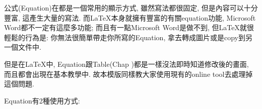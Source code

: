 

公式(Equation)在都是一個常用的顯示方式, 雖然寫法都很固定, 但是內容可以十分豐富, 這產生大量的寫法. 而LaTeX本身就擁有豐富的有關equation功能, Microsoft Word都不一定有這麼多功能; 而且有一點Microsoft Word是做不到, 但LaTeX就很輕鬆的行為是: 你無法很簡單帶走你所寫的Equation, 拿去轉成圖片或是copy到另一個文件中.

但是在LaTeX中, Equation跟Table(Chap )都是一樣沒法即時知道修改後的畫面, 而且都會出現在基本教學中. 故本模版同樣教大家使用現有的online tool去處理掉這個問題.

{}
Equation有2種使用方式:

